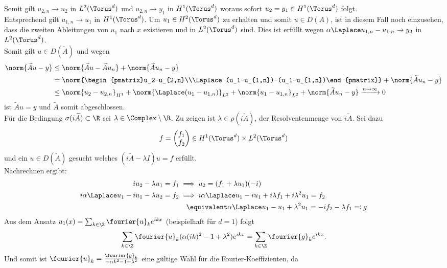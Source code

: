 Somit gilt $u_{2,n}\to u_2$ in $L^2(\Torus^d)$ und $u_{2,n}\to y_1$ in $H^1(\Torus^d)$ woraus sofort $u_2=y_1\in H^1(\Torus^d)$ folgt.\\
Entsprechend gilt $u_{1,n}\to u_1$ in $H^1(\Torus^d)$. Um $u_1\in H^2(\Torus^d)$ zu erhalten und somit $u\in D(A)$, ist in diesem Fall noch einzusehen, dass die zweiten Ableitungen von $u_1$ nach $x$ existieren und in $L^2(\Torus^d)$ sind. Dies ist erfüllt wegen $\alpha \Laplace u_{1,n}-u_{1,n}\to y_2$ in $L^2(\Torus^d)$.\\
Somit gilt $u\in D(\widetilde{A})$ und wegen 
\begin{align*}
\norm{\widetilde{A}u-y}&\le \norm{\widetilde{A}u-\widetilde{A}u_n}+\norm{\widetilde{A}u_n-y}\\
&=\norm{\begin{pmatrix}u_2-u_{2,n}\\\Laplace(u_1-u_{1,n})-(u_1-u_{1,n})\end{pmatrix}}+\norm{\widetilde{A}u_n-y}\\
&\le \norm{u_2-u_{2,n}}_{H^1}+\norm{\Laplace(u_1-u_{1,n})}_{L^2}+\norm{u_1-u_{1,n}}_{L^2}+\norm{\widetilde{A}u_n-y}\xrightarrow{n \to \infty }0
\end{align*}
ist $\widetilde{A}u=y$ und $\widetilde{A}$ somit abgeschlossen.\\
Für die Bedingung $\sigma(i\widetilde{A})\subset \R$ sei $\lambda \in\Complex\setminus\R$. Zu zeigen ist $\lambda \in\rho(i\widetilde{A})$, der Resolventenmenge von $i\widetilde{A}$. Sei dazu
\[f=\begin{pmatrix}f_1\\f_2\end{pmatrix}\in H^1(\Torus^d)\times L^2(\Torus^d)\]
und ein $u\in D(\widetilde{A})$ gesucht welches $(i\widetilde{A}-\lambda I)u=f$ erfüllt.\\
Nachrechnen ergibt:
\begin{align*}
iu_2-\lambda u_1=f_1 &\implies u_2=(f_1+\lambda u_1)(-i)\\
i\alpha \Laplace u_1-iu_1-\lambda u_2=f_2 &\implies i\alpha \Laplace u_1-iu_1+i\lambda f_1+i\lambda^2u_1=f_2\\
&\quad \equivalent \alpha \Laplace u_1-u_1+\lambda^2u_1=-if_2-\lambda f_1\eqqcolon g
\end{align*}
Aus dem Ansatz $u_1(x)=\sum_{k\in\Z}\fourier{u}_ke^{ikx}$ (beispielhaft für $d=1$) folgt
\[\sum_{k\in\Z}\fourier{u}_k(\alpha (ik)^2-1+\lambda^2)e^{ikx}=\sum_{k\in\Z}\fourier{g}_ke^{ikx}.\]
Und somit ist $\fourier{u}_k=\frac{\fourier{g}_k}{-\alpha k^2-1+\lambda^2}$ eine gültige Wahl für die Fourier-Koeffizienten, da 

